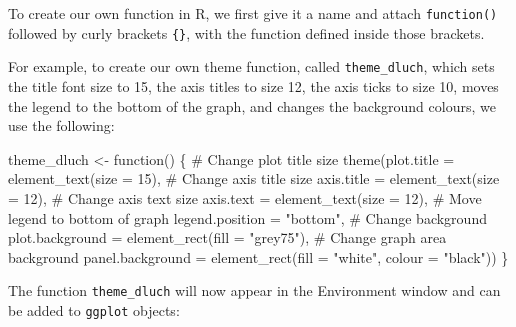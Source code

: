 \documentclass[
  letterpaper,
  DIV=11,
  numbers=noendperiod]{scrreprt}
\newenvironment{Shaded}{\begin{snugshade}}{\end{snugshade}}
\newcommand{\AttributeTok}[1]{\textcolor[rgb]{0.40,0.45,0.13}{#1}}
\newcommand{\CommentTok}[1]{\textcolor[rgb]{0.37,0.37,0.37}{#1}}
\newcommand{\ControlFlowTok}[1]{\textcolor[rgb]{0.00,0.23,0.31}{#1}}
\newcommand{\DecValTok}[1]{\textcolor[rgb]{0.68,0.00,0.00}{#1}}
\newcommand{\FunctionTok}[1]{\textcolor[rgb]{0.28,0.35,0.67}{#1}}
\newcommand{\NormalTok}[1]{\textcolor[rgb]{0.00,0.23,0.31}{#1}}
\newcommand{\OtherTok}[1]{\textcolor[rgb]{0.00,0.23,0.31}{#1}}
\newcommand{\StringTok}[1]{\textcolor[rgb]{0.13,0.47,0.30}{#1}}
\begin{document}
To create our own function in R, we first give it a name and attach
\texttt{function()} followed by curly brackets \texttt{\{\}}, with the
function defined inside those brackets.

For example, to create our own theme function, called
\texttt{theme\_dluch}, which sets the title font size to 15, the axis
titles to size 12, the axis ticks to size 10, moves the legend to the
bottom of the graph, and changes the background colours, we use the
following:

\begin{Shaded}
\begin{Highlighting}[]
\NormalTok{theme\_dluch }\OtherTok{\textless{}{-}} \ControlFlowTok{function}\NormalTok{() \{}
  \CommentTok{\# Change plot title size}
  \FunctionTok{theme}\NormalTok{(}\AttributeTok{plot.title =} \FunctionTok{element\_text}\NormalTok{(}\AttributeTok{size =} \DecValTok{15}\NormalTok{),}
        \CommentTok{\# Change axis title size}
        \AttributeTok{axis.title =} \FunctionTok{element\_text}\NormalTok{(}\AttributeTok{size =} \DecValTok{12}\NormalTok{),}
        \CommentTok{\# Change axis text size}
        \AttributeTok{axis.text =} \FunctionTok{element\_text}\NormalTok{(}\AttributeTok{size =} \DecValTok{12}\NormalTok{),}
        \CommentTok{\# Move legend to bottom of graph}
        \AttributeTok{legend.position =} \StringTok{"bottom"}\NormalTok{,}
        \CommentTok{\# Change background}
        \AttributeTok{plot.background =} \FunctionTok{element\_rect}\NormalTok{(}\AttributeTok{fill =} \StringTok{"grey75"}\NormalTok{),}
        \CommentTok{\# Change graph area background}
        \AttributeTok{panel.background =} \FunctionTok{element\_rect}\NormalTok{(}\AttributeTok{fill =} \StringTok{"white"}\NormalTok{, }
                                        \AttributeTok{colour =} \StringTok{"black"}\NormalTok{))}
\NormalTok{\}}
\end{Highlighting}
\end{Shaded}

The function \texttt{theme\_dluch} will now appear in the Environment
window and can be added to \texttt{ggplot} objects:
\end{document}
